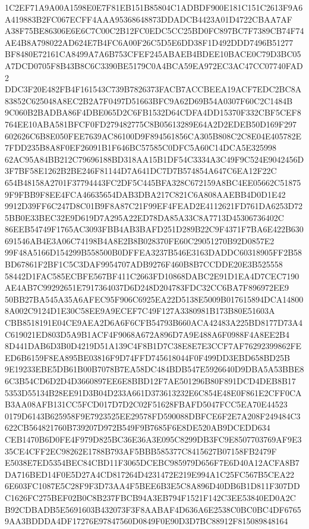 \documentclass[UTF8,fontset=fandol,zihao=-4,a4paper]{ctexart}
\begin{document}
{{1C2EF71A9A00A1598E0E7F81EB151B85804C1ADBDF900E181C151C2613F9A6A419883B2FC067ECFF4AAA95368648873DDADCB4423A01D4722CBAA7AF
A38F75BE86306E6E6C7C00C2B12FC0EDC5CC25BD0FC897BC7F7389CB74F74AE4B8A798022AD624E7B4FC6A00F26C5D5E6DD38F1D492DDD7496B51277
BF8480E72161CA8499A7A6B753CFEF245ABAEB4BDEE10BACE0C79D3BC05A7DCD0705F8B43B8C6C3390BE5179C0A4BCA59EA972EC3AC47CC07740FAD2
DDC3F20E482FB4F161543C739B7826373FACB7ACCBEEA19ACF7EDC2BC8A83852C625048A8EC2B2A7F0497D51663BFC9A62D69B54A0307F60C2C1484B
9C060B2BADBA86F4DBE065D2C6FB1532D64CDFA4DD15370F332CBF5CEF8764EE10ABA581BFCF0FD279482775C8B05613289E64A2D2EDEB50D169F297
602626C6B8E050FEE7639AC86100D9F894561856CA305B808C2C8E04E405782E7FDD235B8A8F0EF26091B1F646BC57585C0DFC5A60C14DCA5E325998
62AC95A84BB212C79696188BD318AA15B1DF54C3334A3C49F9C524E9042456D3F7BF58E1262B2BE246F81144D7A641DC7D7B574854A647C6EA12F22C
654B48158A2701F37794443FC2DF5C445BFA328C672159A8BC4EE05662C518759F9FBB9F8EE4FCA46635654DAB3DBA217C821C6A808AAEBB4D0D1E42
9912D39FF6C247D8C01B9F8A87C21F99EF4FEAD2E4112621FD761DA6253D725BB0E33BEC32E9D619D7A295A22ED78DA85A33C8A7713D45306736402C
86EEB54749F1765AC3093FBB4AB3BAFD251D289B22C9F4371F7BA6E422B630691546AB4E3A06C74198B4A8E2B8B028370FE60C29051270B92D0857E2
99F48A5166D154299B558500B0DFFEA3237B546E3163DADDC60318905FF2B58BD67861F2BF1C5C3DAF9954707ADB9276F460B8B7CCDDE20E3B525558
58442D1FAC585ECBFE567BF411C2663FD10868DABC2E91D1EA4D7CEC7190AE4AB7C99292651E7917364037D6D248D204783FDC32CC6BA7F896972EE9
50BB27BA545A35A6AFEC95F906C6925EA22D5138E5009B017615894DCA148008A002C9124D1E30C58EE9A9ECEF7C49F127A3380981B173B80E51603A
CBB8518191E04CE9AEA2D6A6F6CFB54793B660ACA42483A225BD8177D73A4C619021ED803D5A9B1ACF4F9068A672A896D7A9E488A6F0988F4A8EE2B4
8D441DAB6D3B0D4219D51A139C4F8B1D7C38E8E7E3CCF7AF76292399862FEED6B6159F8EA895BE03816F9D74FFD745618044F0F499DD3EBD658BD25B
9E19233EBE5DB61B00B7078B7EA58DC484BDB547E5926640D9DBA5A53BBE86C3B54CD6D2D4D3660897EE6E8BBD12F7AE501296B80F891DCD4DEB8B17
5353D55134B28EE91D3B04D233A661D373613232E6C854E48E0F861E2CFF0CAB3AA08AFB131CC5FCD017D7D2C02F51628FBAFD5047FCC5EA70E44523
0179D6143B625958F9E7923525EE29578FD590088DBFCE6F2E7A208F249484C3622CB564821760B739207D972B549F9B7685F6E8DE520AB9DCEDD634
CEB1470B6D0FE4F979D825BC36E36A3E095C8299DB3FC9E8507703769AF9E335CE4CFF2EC98262E1788B793AF5BBB585377C8415627B07158FB2479F
E5038E7ED5354BEC84CBD11F3065DCEBC985979D656F7E6D40A12ACFA8B7DA716BED14F0E5D27A4CD817264D4231472E219E994A1C25FC567B5CEA22
6E603FC1087E5C28F9F3D73AA4F5BEE6B3E5C8A896D40DB6B1D811F307DDC1626FC275BEF02B0C8B237FBCB94A3EB794F1521F142C3EE53840ED0A2C
B92CDBADB5E5691603B432073F3F8AABAF4D636A6E2538C0BC0BC4DF67659AA3BDDDA4DF17276E97847560D0849F0E90D3D7BC88912F815089848164
}}
\end{document}
